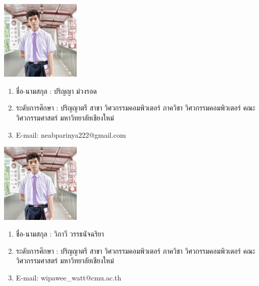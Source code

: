 \documentclass[final]{cpecmu}
\author{นายปริญญา ม่วงรอด}{Parinya Muangrod}{630612104}
\author{นางสาววิภาวี วรรธนัจฉริยา}{Wipawee Wattanutchariya}{630612190}
\begin{document}


\pagestyle{empty}\cleardoublepage
\normalspacing \setcounter{page}{1}  \pagestyle{cpecmu}





\ifproject
  
\fi



\ifproject
  \normalspacing
  \appendix
  

  \ifglossary\glossarypage\fi

  \ifindex\indexpage\fi

  \begin{biosketch}
    \begin{center}
      \includegraphics[width=1.5in]{Images/Profile Parinya.jpg}
    \end{center}
    \begin{enumerate}
      \item[] ชื่อ-นามสกุล : ปริญญา ม่วงรอด
      \item[] ระดับการศึกษา : ปริญญาตรี สาขา วิศวกรรมคอมพิวเตอร์ ภาควิชา วิศวกรรมคอมพิวเตอร์ คณะ วิศวกรรมศาสตร์ มหาวิทยาลัยเชียงใหม่
      \item[] E-mail: neabparinya222@gmail.com
    \end{enumerate}

    \begin{center}
      \includegraphics[width=1.5in]{Images/Profile Parinya.jpg}
    \end{center}
    \begin{enumerate}
      \item[] ชื่อ-นามสกุล : วิภาวี วรรธนัจฉริยา
      \item[] ระดับการศึกษา : ปริญญาตรี สาขา วิศวกรรมคอมพิวเตอร์ ภาควิชา วิศวกรรมคอมพิวเตอร์ คณะ วิศวกรรมศาสตร์ มหาวิทยาลัยเชียงใหม่
      \item[] E-mail: wipawee\_watt@cmu.ac.th
    \end{enumerate}
  \end{biosketch}
\fi %
\end{document}
